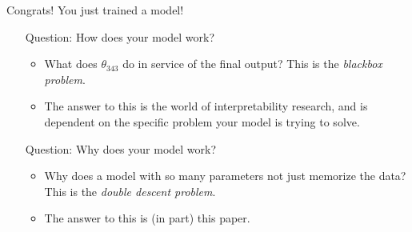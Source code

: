 \documentclass{beamer}
\begin{document}
\begin{frame}{Congrats! You just trained a model!}
\pause
\begin{center}
\begin{enumerate}
\item[Question:] How does your model work?
\pause
\begin{itemize}
    \item What does $\theta_{343}$ do in service of the final output? This is the \emph{blackbox problem}.
    \pause
    \item The answer to this is the world of interpretability research, and is dependent on the specific problem your model is trying to solve. 
    \pause
\end{itemize}
\item[Question:] Why does your model work?
\pause
\begin{itemize}
    \item Why does a model with so many parameters not just memorize the data? This is the \emph{double descent problem}.
    \pause
    \item The answer to this is (in part) this paper. 
\end{itemize}
\end{enumerate}
\end{center}

\end{frame}
\end{document}
